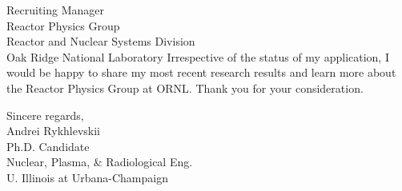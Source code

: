 \documentclass[11pt]{letter} %
\newcommand{\RecipientName}{Recruiting Manager\xspace}
\newcommand{\RecipientAddress}{Reactor Physics Group\\ Reactor and Nuclear Systems Division\\ Oak Ridge National Laboratory}
\begin{document}
\begin{letter}{\RecipientName\\
        \RecipientAddress\xspace}
Irrespective of the status of my application, I would be happy to share my most recent research results and learn more about the Reactor Physics Group at ORNL. Thank you for your consideration.

\closing{Sincere regards,\\
{Andrei Rykhlevskii\\
Ph.D. Candidate\\
Nuclear, Plasma, \& Radiological Eng.\\
U. Illinois at Urbana-Champaign}
}


\end{letter}
\end{document}
